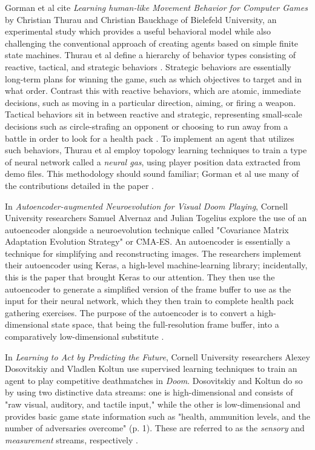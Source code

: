 Gorman et al cite {\it Learning human-like Movement Behavior for Computer Games} by Christian Thurau and Christian Bauckhage of Bielefeld University, an experimental study which provides a useful behavioral model while also challenging the conventional approach of creating agents based on simple finite state machines. Thurau et al define a hierarchy of behavior types consisting of reactive, tactical, and strategic behaviors \cite{Thurau:2004}. Strategic behaviors are essentially long-term plans for winning the game, such as which objectives to target and in what order. Contrast this with reactive behaviors, which are atomic, immediate decisions, such as moving in a particular direction, aiming, or firing a weapon. Tactical behaviors sit in between reactive and strategic, representing small-scale decisions such as circle-strafing an opponent or choosing to run away from a battle in order to look for a health pack \cite{Gorman:2006}. To implement an agent that utilizes such behaviors, Thurau et al employ topology learning techniques to train a type of neural network called a {\it neural gas}, using player position data extracted from demo files. This methodology should sound familiar; Gorman et al use many of the contributions detailed in the paper \cite{Thurau:2004}.

In {\it Autoencoder-augmented Neuroevolution for Visual Doom Playing}, Cornell University researchers Samuel Alvernaz and Julian Togelius explore the use of an autoencoder alongside a neuroevolution technique called "Covariance Matrix Adaptation Evolution Strategy" or CMA-ES. An autoencoder is essentially a technique for simplifying and reconstructing images. The researchers implement their autoencoder using Keras, a high-level machine-learning library; incidentally, this is the paper that brought Keras to our attention. They then use the autoencoder to generate a simplified version of the frame buffer to use as the input for their neural network, which they then train to complete health pack gathering exercises. The purpose of the autoencoder is to convert a high-dimensional state space, that being the full-resolution frame buffer, into a comparatively low-dimensional substitute \cite{Alvernaz:2017}.

In {\it Learning to Act by Predicting the Future}, Cornell University researchers Alexey Dosovitskiy and Vladlen Koltun use supervised learning techniques to train an agent to play competitive deathmatches in {\it Doom}. Dosovitskiy and Koltun do so by using two distinctive data streams: one is high-dimensional and consists of "raw visual, auditory, and tactile input," while the other is low-dimensional and provides basic game state information such as "health, ammunition levels, and the number of adversaries overcome" (p. 1). These are referred to as the {\it sensory} and {\it measurement} streams, respectively \cite{Dosovitskiy:2016}.


